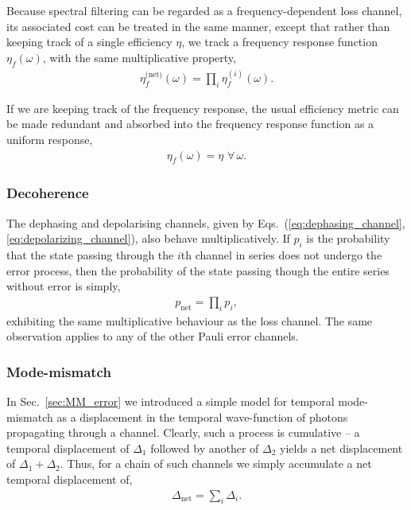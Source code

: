 \documentclass[aps, rmp, twocolumn, amsmath, amssymb, nofootinbib, superscriptaddress, longbibliography, floatfix, table-of-contents, eqsecnum]{revtex4-1}
\begin{document}
Because spectral filtering can be regarded as a frequency-dependent loss channel, its associated cost can be treated in the same manner, except that rather than keeping track of a single efficiency $\eta$, we track a frequency response function $\eta_f(\omega)$, with the same multiplicative property,
\begin{align}
	\eta_f^\text{(net)}(\omega)=\prod_i \eta_f^{(i)}(\omega).
\end{align}

If we are keeping track of the frequency response, the usual efficiency metric can be made redundant and absorbed into the frequency response function as a uniform response,
\begin{align}
	\eta_f(\omega)=\eta\,\,\forall\,\omega.
\end{align}

%
%

\subsubsection{Decoherence}   

The dephasing and depolarising channels, given by Eqs.~(\ref{eq:dephasing_channel},\ref{eq:depolarizing_channel}), also behave multiplicatively. If $p_i$ is the probability that the state passing through the $i$th channel in series does not undergo the error process, then the probability of the state passing though the entire series without error is simply,
\begin{align}
p_\text{net}=\prod_i p_i,
\end{align}
exhibiting the same multiplicative behaviour as the loss channel. The same observation applies to any of the other Pauli error channels.

%
%

\subsubsection{Mode-mismatch} 

In Sec.~\ref{sec:MM_error} we introduced a simple model for temporal mode-mismatch as a displacement in the temporal wave-function of photons propagating through a channel. Clearly, such a process is cumulative -- a temporal displacement of $\Delta_1$ followed by another of $\Delta_2$ yields a net displacement of \mbox{$\Delta_1+\Delta_2$}. Thus, for a chain of such channels we simply accumulate a net temporal displacement of,
\begin{align}
\Delta_\text{net} = \sum_i \Delta_i.
\end{align}
\end{document}
